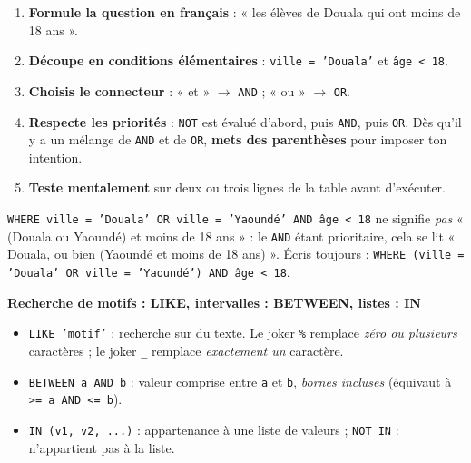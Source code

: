 \documentclass[11pt]{article}
\begin{document}
\begin{methode}
\begin{enumerate}
\item \textbf{Formule la question en français} : « les élèves de Douala qui ont moins de 18 ans ».
\item \textbf{Découpe en conditions élémentaires} : \texttt{ville = 'Douala'} et \texttt{âge < 18}.
\item \textbf{Choisis le connecteur} : « et » $\rightarrow$ \texttt{AND} ; « ou » $\rightarrow$ \texttt{OR}.
\item \textbf{Respecte les priorités} : \texttt{NOT} est évalué d'abord, puis \texttt{AND}, puis \texttt{OR}. Dès qu'il y a un mélange de \texttt{AND} et de \texttt{OR}, \textbf{mets des parenthèses} pour imposer ton intention.
\item \textbf{Teste mentalement} sur deux ou trois lignes de la table avant d'exécuter.
\end{enumerate}
\end{methode}

\begin{attention}
\texttt{WHERE ville = 'Douala' OR ville = 'Yaoundé' AND âge < 18} ne signifie \emph{pas} « (Douala ou Yaoundé) et moins de 18 ans » : le \texttt{AND} étant prioritaire, cela se lit « Douala, ou bien (Yaoundé et moins de 18 ans) ». Écris toujours : \texttt{WHERE (ville = 'Douala' OR ville = 'Yaoundé') AND âge < 18}.
\end{attention}

\textbf{Recherche de motifs : LIKE, intervalles : BETWEEN, listes : IN}\par

\begin{propriete}
\begin{itemize}
\item \texttt{LIKE 'motif'} : recherche sur du texte. Le joker \texttt{\%} remplace \emph{zéro ou plusieurs} caractères ; le joker \texttt{\_} remplace \emph{exactement un} caractère.
\item \texttt{BETWEEN a AND b} : valeur comprise entre \texttt{a} et \texttt{b}, \emph{bornes incluses} (équivaut à \texttt{>= a AND <= b}).
\item \texttt{IN (v1, v2, ...)} : appartenance à une liste de valeurs ; \texttt{NOT IN} : n'appartient pas à la liste.
\end{itemize}
\end{propriete}
\end{document}
